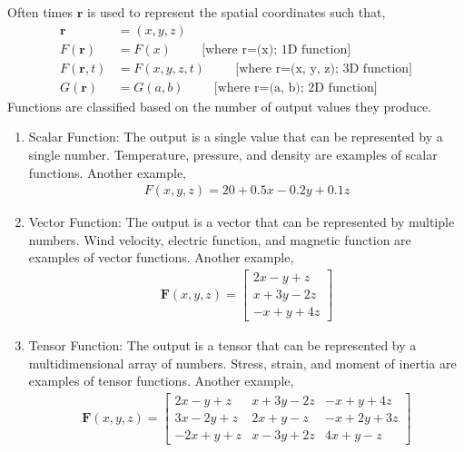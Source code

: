 Often times \( \mathbf{r} \) is used to represent the spatial coordinates
such that,
\begin{align*}
  \mathbf{r} &= (x, y, z) \\
  F(\mathbf{r}) &= F(x) \hspace{1cm} \text{[where r=(x); 1D function]} \\
  F(\mathbf{r}, t) &= F(x, y, z, t) \hspace{1cm} \text{[where r=(x, y, z); 3D function]} \\
  G(\mathbf{r}) &= G(a, b) \hspace{1cm} \text{[where r=(a, b); 2D function]}
\end{align*}
Functions are classified based on the number of output values they produce.
\begin{enumerate}
  \item Scalar Function: The output is a single value that can be
    represented by a single number. Temperature, pressure, and density
    are examples of scalar functions. Another example,
    \begin{align*}
      F(x, y, z) = 20 + 0.5x - 0.2y + 0.1z
    \end{align*}
  \item Vector Function: The output is a vector that can be represented
    by multiple numbers. Wind velocity, electric function, and magnetic
    function are examples of vector functions. Another example,
    \begin{align*}
      \mathbf{F}(x, y, z) = \begin{bmatrix}
        2x - y + z \\
        x + 3y - 2z \\
        -x + y + 4z
      \end{bmatrix}
    \end{align*}
  \item Tensor Function: The output is a tensor that can be represented
    by a multidimensional array of numbers. Stress, strain, and moment
    of inertia are examples of tensor functions. Another example,
    \begin{align*}
      \mathbf{F}(x, y, z) = \begin{bmatrix}
        2x - y + z & x + 3y - 2z & -x + y + 4z \\
        3x - 2y + z & 2x + y - z & -x + 2y + 3z \\
        -2x + y + z & x - 3y + 2z & 4x + y - z
      \end{bmatrix}
    \end{align*}
\end{enumerate}

